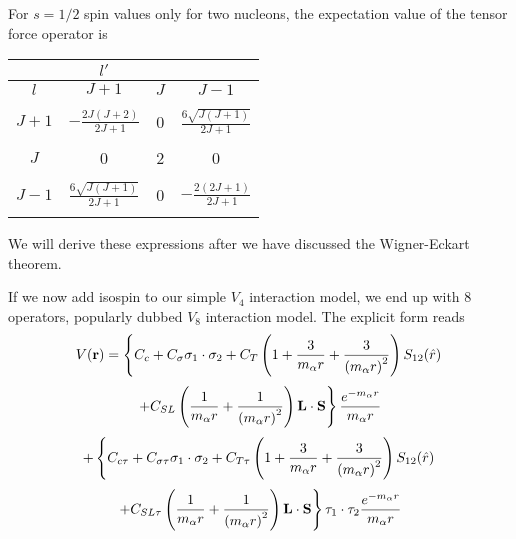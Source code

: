 \documentclass[graybox,sectrefs,envcountresetchap,open=right]{svmonodo}
\begin{document}
 For $s=1/2$ spin values only for two nucleons, the expectation value of the tensor force operator is 



{\small   %

\vspace{4mm}

\begin{tabular}{cccc}
\hline
\multicolumn{1}{c}{  } & \multicolumn{1}{c}{ $l'$ } & \multicolumn{1}{c}{  } & \multicolumn{1}{c}{  } \\
\hline
$l$   & $J+1$                         & $J$ & $J-1$                         \\
\hline
      &                               &     &                               \\
$J+1$ & $-\frac{2J(J+2)}{2J+1}$       & 0   & $\frac{6\sqrt{J(J+1)}}{2J+1}$ \\
      &                               &     &                               \\
$J$   & 0                             & 2   & 0                             \\
      &                               &     &                               \\
$J-1$ & $\frac{6\sqrt{J(J+1)}}{2J+1}$ & 0   & $-\frac{2(2J+1)}{2J+1}$       \\
      &                               &     &                               \\
\hline
\end{tabular}

\vspace{4mm}

}


\noindent
We will derive these expressions after we have discussed the Wigner-Eckart theorem. 




If we now add isospin to our simple $V_4$ interaction model, we end up with $8$ operators, popularly dubbed $V_8$ interaction model. The explicit form reads
\[
V(\mathbf{r})= \left\{ C_c + C_\mathbf{\sigma} \mathbf{\sigma}_1\cdot\mathbf{\sigma}_2
 + C_T \left( 1 + {3\over m_\alpha r} + {3\over
\left(m_\alpha r\right)^2}\right) S_{12} (\hat r)\right. 
\]
\[
\left. + C_{SL} \left( {1\over m_\alpha r} + {1\over \left( m_\alpha r\right)^2}
\right) \mathbf{L}\cdot \mathbf{S}
\right\} \frac{e^{-m_\alpha r}}{m_\alpha r}
\]
\[
+ \left\{ C_{c\tau} + C_{\sigma\tau}\mathbf{\sigma}_1\cdot\mathbf{\sigma}_2
 + C_{T\tau} \left( 1 + {3\over m_\alpha r} + {3\over
\left(m_\alpha r\right)^2}\right) S_{12} (\hat r)\right. 
\]
\[
\left. + C_{SL\tau} \left( {1\over m_\alpha r} + {1\over \left( m_\alpha r\right)^2}
\right) \mathbf{L}\cdot \mathbf{S}
\right\}\mathbf{\tau}_1\cdot\mathbf{\tau}_2 \frac{e^{-m_\alpha r}}{m_\alpha r}
\]
\end{document}
